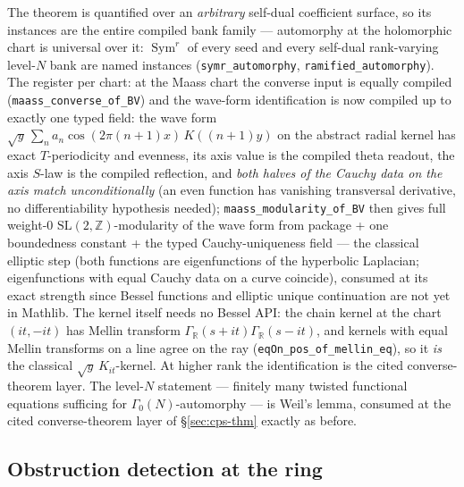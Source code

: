 \documentclass[11pt]{article}
\theoremstyle{definition}
\newcommand{\Sym}{\operatorname{Sym}}
\begin{document}
\noindent The theorem is quantified over an \emph{arbitrary} self-dual coefficient
surface, so its instances are the entire compiled bank family --- automorphy at the
holomorphic chart is universal over it: $\Sym^r$ of every seed and every self-dual
rank-varying level-$N$ bank are named instances
(\texttt{symr\_automorphy}, \texttt{ramified\_automorphy}).  The register per chart:
at the Maass chart the converse input is equally compiled
(\texttt{maass\_converse\_of\_BV}) and the wave-form identification is now compiled
up to exactly one typed field: the wave form
$\sqrt y\,\sum_n a_n\cos(2\pi(n{+}1)x)\,K((n{+}1)y)$ on the abstract radial kernel
has exact $T$-periodicity and evenness, its axis value is the compiled theta
readout, the axis $S$-law is the compiled reflection, and \emph{both halves of the
Cauchy data on the axis match unconditionally} (an even function has vanishing
transversal derivative, no differentiability hypothesis needed);
\texttt{maass\_modularity\_of\_BV} then gives full weight-$0$
$\mathrm{SL}(2,\mathbb Z)$-modularity of the wave form from package + one
boundedness constant + the typed Cauchy-uniqueness field --- the classical elliptic
step (both functions are eigenfunctions of the hyperbolic Laplacian; eigenfunctions
with equal Cauchy data on a curve coincide), consumed at its exact strength since
Bessel functions and elliptic unique continuation are not yet in Mathlib.  The
kernel itself needs no Bessel API: the chain kernel at the chart $(it,-it)$ has
Mellin transform $\Gamma_{\mathbb R}(s+it)\Gamma_{\mathbb R}(s-it)$, and kernels
with equal Mellin transforms on a line agree on the ray
(\texttt{eqOn\_pos\_of\_mellin\_eq}), so it \emph{is} the classical
$\sqrt y\,K_{it}$-kernel.  At higher rank the identification is the cited
converse-theorem layer.  The level-$N$ statement --- finitely many twisted functional
equations sufficing for $\Gamma_0(N)$-automorphy --- is Weil's lemma, consumed at the
cited converse-theorem layer of \S\ref{sec:cps-thm} exactly as before.

\subsection*{Obstruction detection at the ring}
\end{document}

